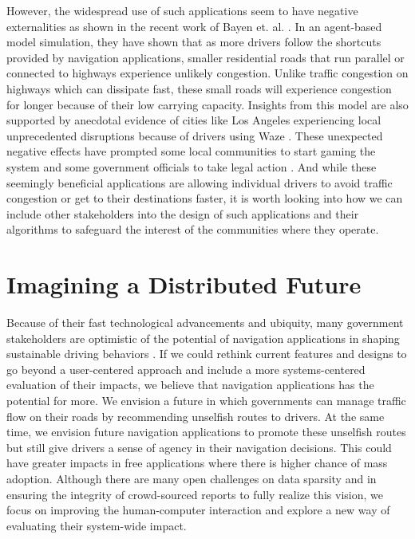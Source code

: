 However, the widespread use of such applications seem to have negative externalities as shown in the recent work of Bayen et. al. \cite{Thai2016NegativeApproach}. In an agent-based model simulation, they have shown that as more drivers follow the shortcuts provided by navigation applications, smaller residential roads that run parallel or connected to highways experience unlikely congestion. Unlike traffic congestion on highways which can dissipate fast, these small roads will experience congestion for longer because of their low carrying capacity. Insights from this model are also supported by anecdotal evidence of cities like Los Angeles experiencing local unprecedented disruptions because of drivers using Waze \cite{Battelle2016TheShift, Thornton2015HowTimes, Wirtschafter2017DrivingKALW}. These unexpected negative effects have prompted some local communities to start gaming the system \cite{Weise2017WazeAlgorithms} and some government officials to take legal action \cite{Farivar2018LATechnica}. And while these seemingly beneficial applications are allowing individual drivers to avoid traffic congestion or get to their destinations faster, it is worth looking into how we can include other stakeholders into the design of such applications and their algorithms to safeguard the interest of the communities where they operate.

\section{Imagining a Distributed Future}
Because of their fast technological advancements and ubiquity, many government stakeholders are optimistic of the potential of navigation applications in shaping sustainable driving behaviors \cite{Attard2016TheSystems}. If we could rethink current features and designs to go beyond a user-centered approach and include a more systems-centered evaluation of their impacts, we believe that navigation applications has the potential for more. We envision a future in which governments can manage traffic flow on their roads by recommending unselfish routes to drivers. At the same time, we envision future navigation applications to promote these unselfish routes but still give drivers a sense of agency in their navigation decisions. This could have greater impacts in free applications where there is higher chance of mass adoption. Although there are many open challenges on data sparsity and in ensuring the integrity of crowd-sourced reports \cite{Silva2016UsersOpportunities,QingYang2015TowardNetworks,Vyroubal2016MobileSystems} to fully realize this vision, we focus on improving the human-computer interaction and explore a new way of evaluating their system-wide impact.

